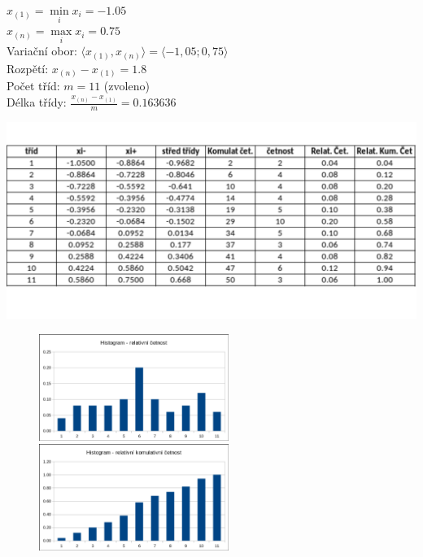 \documentclass[11pt,a4paper]{article}
\begin{document}
$x_{(1)} = \min\limits_i x_i = -1.05$ \\

$x_{(n)} = \max\limits_i x_i = 0.75$ \\

Variační obor: $ \langle x_{(1)}, x_{(n)} \rangle = \langle -1,05; 0,75 \rangle$ \\

Rozpětí: $ x_{(n)} - x_{(1)} = 1.8 $ \\

Počet tříd: $m = 11$ (zvoleno) \\ 

Délka třídy: $\frac{x_{(n)} - x_{(1)}}{m} = 0.163636 $

\includegraphics[width=\textwidth]{img/1atable.pdf}\vspace{-1,75cm}

\begin{figure}[H]
    \centering
    \includegraphics[width=0.55\textwidth]{img/1ahistogram1.pdf}
    \includegraphics[width=0.55\textwidth]{img/1ahistogram2.pdf}
\end{figure}
\end{document}
